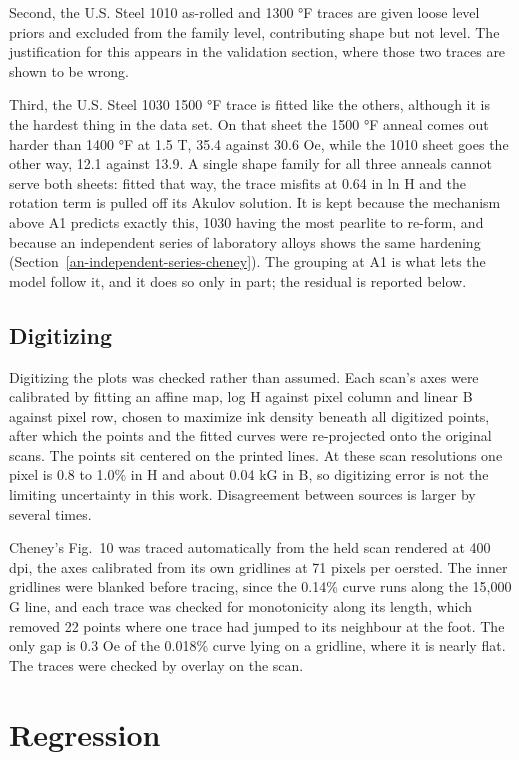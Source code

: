 \documentclass[
  11pt,
]{article}
\begin{document}
Second, the U.S. Steel 1010 as-rolled and 1300 °F traces are given loose level priors and excluded from the family level, contributing shape but not level. The justification for this appears in the validation section, where those two traces are shown to be wrong.

Third, the U.S. Steel 1030 1500 °F trace is fitted like the others, although it is the hardest thing in the data set. On that sheet the 1500 °F anneal comes out harder than 1400 °F at 1.5 T, 35.4 against 30.6 Oe, while the 1010 sheet goes the other way, 12.1 against 13.9. A single shape family for all three anneals cannot serve both sheets: fitted that way, the trace misfits at 0.64 in ln H and the rotation term is pulled off its Akulov solution. It is kept because the mechanism above A1 predicts exactly this, 1030 having the most pearlite to re-form, and because an independent series of laboratory alloys shows the same hardening (Section~\ref{an-independent-series-cheney}). The grouping at A1 is what lets the model follow it, and it does so only in part; the residual is reported below.

\subsection{Digitizing}\label{digitizing}

Digitizing the plots was checked rather than assumed. Each scan's axes were calibrated by fitting an affine map, log H against pixel column and linear B against pixel row, chosen to maximize ink density beneath all digitized points, after which the points and the fitted curves were re-projected onto the original scans. The points sit centered on the printed lines. At these scan resolutions one pixel is 0.8 to 1.0\% in H and about 0.04 kG in B, so digitizing error is not the limiting uncertainty in this work. Disagreement between sources is larger by several times.

Cheney's Fig.~10 was traced automatically from the held scan rendered at 400 dpi, the axes calibrated from its own gridlines at 71 pixels per oersted. The inner gridlines were blanked before tracing, since the 0.14\% curve runs along the 15,000 G line, and each trace was checked for monotonicity along its length, which removed 22 points where one trace had jumped to its neighbour at the foot. The only gap is 0.3 Oe of the 0.018\% curve lying on a gridline, where it is nearly flat. The traces were checked by overlay on the scan.

\section{Regression}\label{regression}
\end{document}
